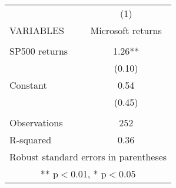 \begin{tabular}{lc} \hline
 & (1) \\
VARIABLES & Microsoft returns \\ \hline
 &  \\
SP500 returns & 1.26** \\
 & (0.10) \\
Constant & 0.54 \\
 & (0.45) \\
 &  \\
Observations & 252 \\
 R-squared & 0.36 \\ \hline
\multicolumn{2}{c}{ Robust standard errors in parentheses} \\
\multicolumn{2}{c}{ ** p$<$0.01, * p$<$0.05} \\
\end{tabular}

